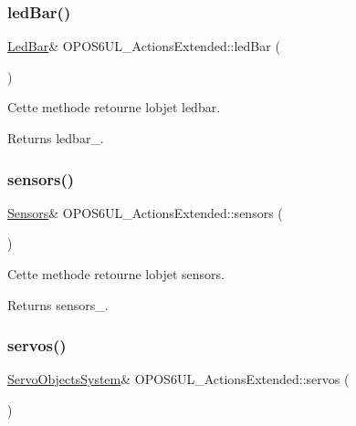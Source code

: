 \subsubsection{\texorpdfstring{led\+Bar()}{ledBar()}}
{\footnotesize\ttfamily \hyperlink{classLedBar}{Led\+Bar}\& O\+P\+O\+S6\+U\+L\+\_\+\+Actions\+Extended\+::led\+Bar (\begin{DoxyParamCaption}{ }\end{DoxyParamCaption})\hspace{0.3cm}{\ttfamily [inline]}}



Cette methode retourne l\textquotesingle{}objet ledbar. 

\begin{DoxyReturn}{Returns}
ledbar\+\_\+. 
\end{DoxyReturn}
\mbox{\label{classOPOS6UL__ActionsExtended_a3475484a307a07d60fd57fb9f49be8f5}} 
\subsubsection{\texorpdfstring{sensors()}{sensors()}}
{\footnotesize\ttfamily \hyperlink{classSensors}{Sensors}\& O\+P\+O\+S6\+U\+L\+\_\+\+Actions\+Extended\+::sensors (\begin{DoxyParamCaption}{ }\end{DoxyParamCaption})\hspace{0.3cm}{\ttfamily [inline]}}



Cette methode retourne l\textquotesingle{}objet sensors. 

\begin{DoxyReturn}{Returns}
sensors\+\_\+. 
\end{DoxyReturn}
\mbox{\label{classOPOS6UL__ActionsExtended_a1a6ccdf4aae1302cdf664d32ae5a67c6}} 
\subsubsection{\texorpdfstring{servos()}{servos()}}
{\footnotesize\ttfamily \hyperlink{classServoObjectsSystem}{Servo\+Objects\+System}\& O\+P\+O\+S6\+U\+L\+\_\+\+Actions\+Extended\+::servos (\begin{DoxyParamCaption}{ }\end{DoxyParamCaption})\hspace{0.3cm}{\ttfamily [inline]}}



